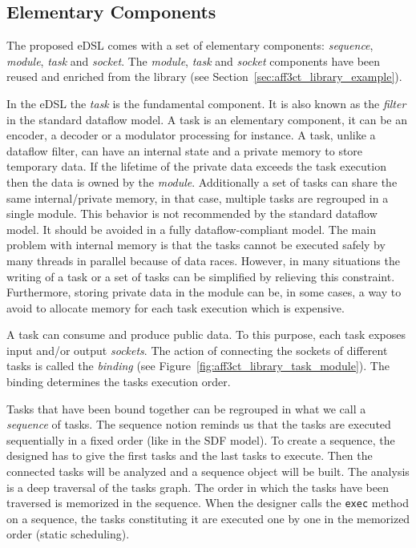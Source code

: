 \subsection{Elementary Components}

The proposed eDSL comes with a set of elementary components: \emph{sequence},
\emph{module}, \emph{task} and \emph{socket}. The \emph{module}, \emph{task} and
\emph{socket} components have been reused and enriched from the \AFFECT library
(see Section~\ref{sec:aff3ct_library_example}).

In the eDSL the \emph{task} is the fundamental component. It is also known as
the \emph{filter} in the standard dataflow model. A task is an elementary
component, it can be an encoder, a decoder or a modulator processing for
instance. A task, unlike a dataflow filter, can have an internal state and a
private memory to store temporary data. If the lifetime of the private data
exceeds the task execution then the data is owned by the \emph{module}.
Additionally a set of tasks can share the same internal/private memory, in that
case, multiple tasks are regrouped in a single module. This behavior is not
recommended by the standard dataflow model. It should be avoided in a fully
dataflow-compliant model. The main problem with internal memory is that the
tasks cannot be executed safely by many threads in parallel because of data
races. However, in many situations the writing of a task or a set of tasks can
be simplified by relieving this constraint. Furthermore, storing private data in
the module can be, in some cases, a way to avoid to allocate memory for each
task execution which is expensive.

A task can consume and produce public data. To this purpose, each task exposes
input and/or output \emph{sockets}. The action of connecting the sockets of
different tasks is called the \emph{binding} (see
Figure~\ref{fig:aff3ct_library_task_module}). The binding determines the tasks
execution order.

Tasks that have been bound together can be regrouped in what we call a
\emph{sequence} of tasks. The sequence notion reminds us that the tasks are
executed sequentially in a fixed order (like in the SDF model). To create a
sequence, the designed has to give the first tasks and the last tasks to
execute. Then the connected tasks will be analyzed and a sequence object will be
built. The analysis is a deep traversal of the tasks graph. The order in which
the tasks have been traversed is memorized in the sequence. When the designer
calls the \verb|exec| method on a sequence, the tasks constituting it are
executed one by one in the memorized order (static scheduling).

